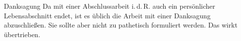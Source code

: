 \vspace*{0pt plus 1fill}
\begin{tucsimplesection}{Danksagung}
  Da mit einer Abschlussarbeit i.\,d.\,R. auch ein persönlicher Lebensabschnitt
  endet, ist es üblich die Arbeit mit einer Danksagung abzuschließen. Sie sollte aber
  nicht zu pathetisch formuliert werden. Das wirkt übertrieben.

  \lipsum[1-2]
\end{tucsimplesection}
\vspace*{0pt plus 2.5fill}
